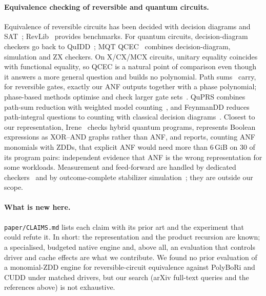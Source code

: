 \documentclass[10pt,a4paper]{article}
\theoremstyle{definition}
\begin{document}
\paragraph{Equivalence checking of reversible and quantum circuits.} Equivalence of
reversible circuits has been decided with decision diagrams and SAT~\cite{wille2009equivalence};
RevLib~\cite{wille2008revlib} provides benchmarks. For quantum circuits, decision-diagram
checkers go back to QuIDD~\cite{viamontes2007checking}; MQT
QCEC~\cite{burgholzer2021advanced,burgholzer2021qcec,qcecrepo} combines decision-diagram,
simulation and ZX checkers. On X/CX/MCX circuits, unitary equality coincides with functional
equality, so QCEC is a natural point of comparison even though it answers a more general
question and builds no polynomial. Path sums~\cite{amy2019towards} carry, for reversible
gates, exactly our ANF outputs together with a phase polynomial; phase-based methods
optimise and check larger gate sets~\cite{amy2014tpar}. QuPRS combines path-sum reduction with
weighted model counting~\cite{huang2026quprs}, and FeynmanDD reduces path-integral questions
to counting with classical decision diagrams~\cite{wang2025feynmandd}. Closest to our
representation, Irene~\cite{ke2026irene} checks hybrid quantum programs, represents Boolean
expressions as XOR--AND graphs rather than ANF, and reports, counting ANF monomials with ZDDs,
that explicit ANF would need more than 6\,GiB on 30 of its program pairs: independent evidence
that ANF is the wrong representation for some workloads. Measurement and feed-forward are
handled by dedicated checkers~\cite{hong2022dynamic,burgholzer2022nonunitaries,
ricciardi2025hybrid} and by outcome-complete stabilizer
simulation~\cite{kliuchnikov2023stabilizer,kliuchnikov2026phased}; they are outside our
scope.

\paragraph{What is new here.} \texttt{paper/CLAIMS.md} lists each claim with its prior art
and the experiment that could refute it. In short: the representation and the product
recursion are known; a specialised, budgeted native engine and, above all, an evaluation that
controls driver and cache effects are what we contribute. We found no prior evaluation of a
monomial-ZDD engine for reversible-circuit equivalence against PolyBoRi and CUDD under matched
drivers, but our search (arXiv full-text queries and the references above) is not exhaustive.
\end{document}
